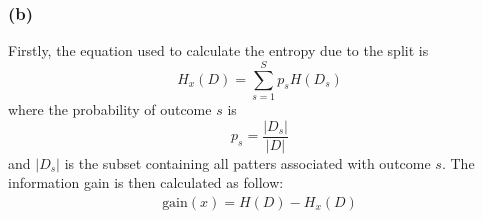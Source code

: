 \documentclass[10pt]{article}
\begin{document}
\subsubsection*{(b)}

Firstly, the equation used to calculate the entropy due to the split is
\begin{equation*}
    H_x(D) = \sum_{s=1}^{S} p_s H(D_s)
\end{equation*}
where the probability of outcome $s$ is
\begin{equation*}
    p_s = \frac{|D_s|}{|D|}
\end{equation*}
and $|D_s|$ is the subset containing all patters associated with outcome $s$.
The information gain is then calculated as follow:
\begin{align*}
    \text{gain}(x) = H(D)-H_x(D)
\end{align*}
\end{document}

